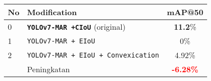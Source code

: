   \begin{tabular}{ l l c }
    \toprule[1.5pt]
    No & Modification        &mAP@50 \\
    \midrule
    0  & \texttt{\textbf{YOLOv7-MAR +CIoU}} (original)     & \textbf{11.2}\%\\
    1  & \texttt{YOLOv7-MAR + EIoU}                & 0\%\\
    2  & \texttt{YOLOv7-MAR + EIoU + Convexication} & 4.92\%\\
    \midrule
       & Peningkatan                                & \textbf{\textcolor{red}{-6.28\%}}\\
    \bottomrule[1.5pt]
  \end{tabular}